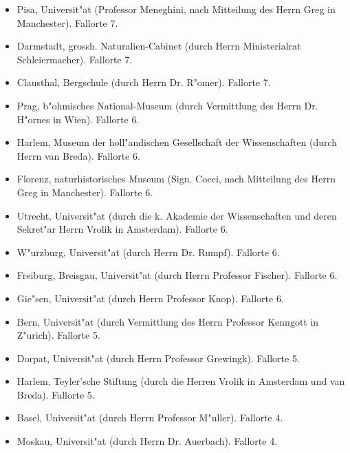 \documentclass[a4paper, 11pt, oneside]{article}
\begin{document}
\begin{itemize}
    \item Pisa, Universit"at (Professor Meneghini, nach Mitteilung des Herrn Greg in Manchester). Fallorte 7.

    \item Darmstadt, grossh. Naturalien-Cabinet (durch Herrn Ministerialrat Schleiermacher). Fallorte 7.

    \item Clausthal, Bergschule (durch Herrn Dr. R"omer). Fallorte 7.

    \item Prag, b"ohmisches National-Museum (durch Vermittlung des Herrn Dr. H"ornes in Wien). Fallorte 6.

    \item Harlem, Museum der holl"andischen Gesellschaft der Wissenschaften (durch Herrn van Breda). Fallorte 6.

    \item Florenz, naturhistorisches Museum (Sign. Cocci, nach Mitteilung des Herrn Greg in Manchester). Fallorte 6.

    \item Utrecht, Universit"at (durch die k. Akademie der Wissenschaften und deren Sekret"ar Herrn Vrolik in Amsterdam). Fallorte 6.

    \item W"urzburg, Universit"at (durch Herrn Dr. Rumpf). Fallorte 6.

    \item Freiburg, Breisgau, Universit"at (durch Herrn Professor Fischer). Fallorte 6.

    \item Gie"sen, Universit"at (durch Herrn Professor Knop). Fallorte 6.

    \item Bern, Universit"at (durch Vermittlung des Herrn Professor Kenngott in Z"urich). Fallorte 5.

    \item Dorpat, Universit"at (durch Herrn Professor Grewingk). Fallorte 5.

    \item Harlem, Teyler'sche Stiftung (durch die Herren Vrolik in Amsterdam und van Breda). Fallorte 5.

    \item Basel, Universit"at (durch Herrn Professor M"uller). Fallorte 4.

    \item Moskau, Universit"at (durch Herrn Dr. Auerbach). Fallorte 4.


\end{itemize}
\end{document}
